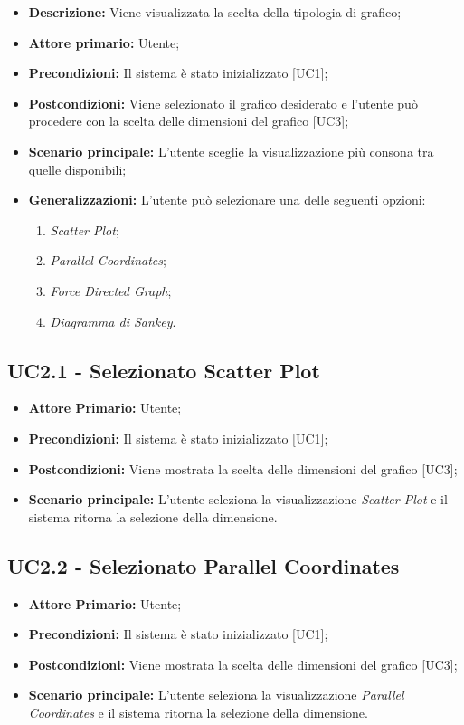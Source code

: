  \begin{itemize}
     \item \textbf{Descrizione:} Viene visualizzata la scelta della tipologia di grafico;
     \item \textbf{Attore primario:} Utente;
     \item \textbf{Precondizioni:} Il sistema è stato inizializzato [UC1];
     \item \textbf{Postcondizioni:} Viene selezionato il grafico desiderato e l'utente può procedere con la scelta delle dimensioni del grafico [UC3];
     \item \textbf{Scenario principale:} L'utente sceglie la visualizzazione più consona tra quelle disponibili;
     \item \textbf{Generalizzazioni:} L'utente può selezionare una delle seguenti opzioni:
     \begin{enumerate}
         \item \textit{Scatter Plot};
         \item \textit{Parallel Coordinates};
         \item \textit{Force Directed Graph};
         \item \textit{Diagramma di Sankey}.
     \end{enumerate}
 \end{itemize}

 \subsection{UC2.1 - Selezionato Scatter Plot}
 \begin{itemize}
     \item \textbf{Attore Primario:} Utente;
     \item \textbf{Precondizioni:} Il sistema è stato inizializzato [UC1];
     \item \textbf{Postcondizioni:} Viene mostrata la scelta delle dimensioni del grafico [UC3];
     \item \textbf{Scenario principale:} L'utente seleziona la visualizzazione \textit{Scatter Plot} e il sistema ritorna la selezione della dimensione.
 \end{itemize}
\subsection{UC2.2 - Selezionato Parallel Coordinates}
\begin{itemize}
   \item \textbf{Attore Primario:} Utente;
   \item \textbf{Precondizioni:} Il sistema è stato inizializzato [UC1];
   \item \textbf{Postcondizioni:} Viene mostrata la scelta delle dimensioni del grafico [UC3];
   \item \textbf{Scenario principale:} L'utente seleziona la visualizzazione \textit{Parallel Coordinates} e il sistema ritorna la selezione della dimensione.
\end{itemize}

